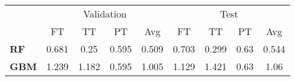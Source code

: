 \begin{tabular}{lcccccccc}
\toprule
{} & \multicolumn{4}{c}{Validation} & \multicolumn{4}{c}{Test} \\
{} &         FT &     TT &     PT &    Avg &     FT &     TT &    PT &    Avg \\
\midrule
\textbf{RF } &      0.681 &   0.25 &  0.595 &  0.509 &  0.703 &  0.299 &  0.63 &  0.544 \\
\textbf{GBM} &      1.239 &  1.182 &  0.595 &  1.005 &  1.129 &  1.421 &  0.63 &   1.06 \\
\bottomrule
\end{tabular}
